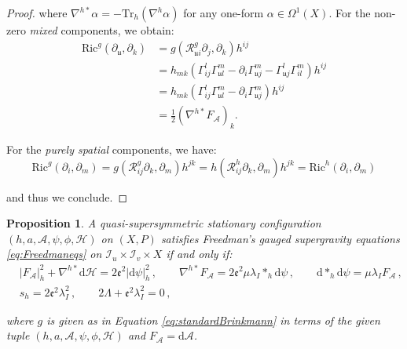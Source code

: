 \documentclass[10pt,a4paper,twoside,reqno]{amsart}
\theoremstyle{plain}
\newtheorem{prop}[thm]{Proposition}
\theoremstyle{definition}
\theoremstyle{remark}
\def\dd{\mathrm{d}}
\def\cR{{\mathcal R}}
\def\cH{\mathcal{H}}
\def\cA{\mathcal{A}}
\def\cI{\mathcal{I}}
\def\cH{\mathcal{H}}
\def\dd{\mathrm{d}}
\def\fru{\mathfrak{u}}
\def\Ric{\mathrm{Ric}}
\begin{document}
\begin{proof}
\noindent
where $\nabla^{h\ast}\alpha = - \mathrm{Tr}_h (\nabla^h \alpha)$ for any one-form $\alpha\in \Omega^1(X)$. For the non-zero \emph{mixed} components, we obtain:
\begin{align*}
\Ric^g (\partial_{\fru} , \partial_{k}) &= g(\cR^g_{\fru i} \partial_j , \partial_k) h^{ij} \\
&=  h_{mk} \left( \Gamma^l_{ij}\Gamma^m_{\fru l} - \partial_i \Gamma^{m}_{\fru j} - \Gamma^l_{\fru j}\Gamma^m_{il} \right) h^{ij} \\
&=  h_{mk} \left( \Gamma^l_{ij}\Gamma^m_{\fru l} - \partial_i \Gamma^{m}_{\fru j}  \right) h^{ij} \\
&= \frac{1}{2}(\nabla^{h\ast}F_{\cA})_k.
\end{align*}

\noindent
For the \emph{purely spatial} components, we have:
\begin{equation*}
\Ric^g (\partial_{i} , \partial_{m}) = g(\cR^g_{ij}\partial_k , \partial_m) h^{jk} = h(\cR^h_{ij}\partial_k , \partial_m) h^{jk} = \Ric^h (\partial_{i} , \partial_{m})
\end{equation*}

\noindent
and thus we conclude.
\end{proof}

\begin{prop}
\label{prop:equivalentBrinkmann}
A quasi-supersymmetric stationary configuration  $(h, a, \cA, \psi, \phi, \cH)$ on $(X,P)$ satisfies Freedman's gauged supergravity equations \eqref{eq:Freedmaneqs} on $\cI_u\times \cI_v\times X$ if and only if:
\begin{eqnarray*}
& \vert F_{\cA}\vert^2_{h} + \nabla^{h\ast}\dd \cH     =   2 \mathfrak{e}^2 \vert \dd \psi\vert^2_h \, , \qquad \nabla^{h\ast} F_{\cA}   =     2 \mathfrak{e}^2 \mu \lambda_I \ast_h \dd\psi \, , \qquad \dd\ast_h \dd \psi   = \mu\lambda_I F_{\cA}\, ,\\
&   s_h = 2 \mathfrak{e}^2 \lambda_I^2\, , \qquad    2 \Lambda  +  \mathfrak{e}^2 \lambda_I^2 = 0\, ,
\end{eqnarray*}

\noindent
where $g$ is given as in Equation \eqref{eq:standardBrinkmann} in terms of the given tuple $(h, a, \cA, \psi, \phi, \cH)$ and $F_{\cA} = \dd\cA$.
\end{prop}
\end{document}
